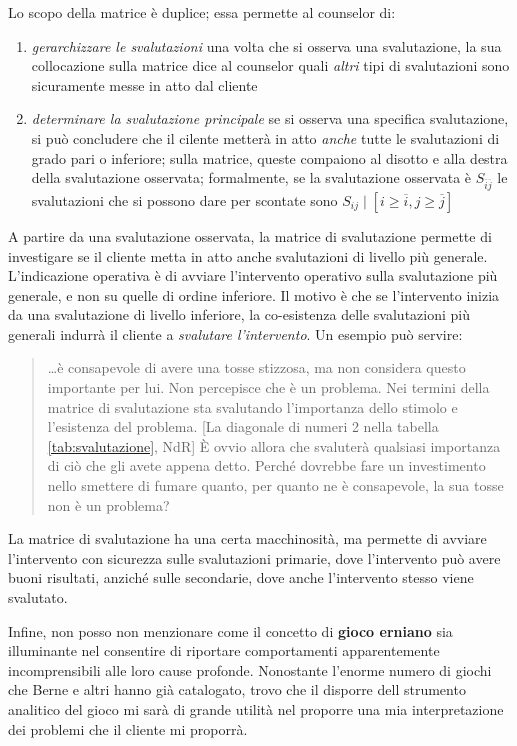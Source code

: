 \noindent Lo scopo della matrice è duplice; essa permette al counselor di:
\begin{enumerate}
\item \emph{gerarchizzare le svalutazioni} una volta che si osserva una svalutazione, la sua collocazione sulla matrice dice al counselor quali \emph{altri} tipi di svalutazioni sono sicuramente messe in atto dal cliente
\item \emph{determinare la svalutazione principale} se si osserva una specifica svalutazione, si può concludere che il cilente metterà in atto \emph{anche} tutte le svalutazioni di grado pari o inferiore; sulla matrice, queste compaiono al disotto e alla destra della svalutazione osservata; formalmente, se la svalutazione osservata è $S_{\overline{i}\overline{j}}$ le svalutazioni che si possono dare per scontate sono $S_{ij} \mid [i\geq\overline{i}, j\geq\overline{j}]$
\end{enumerate}

\noindent A partire da una svalutazione osservata, la matrice di svalutazione permette di investigare se il cliente metta in atto anche svalutazioni di livello più generale. L'indicazione operativa è di avviare l'intervento operativo sulla svalutazione più generale, e non su quelle di ordine inferiore. Il motivo è che se l'intervento inizia da una svalutazione di livello inferiore, la co-esistenza delle svalutazioni più generali indurrà il cliente a \emph{svalutare l'intervento}. Un esempio può servire:
\begin{quotation}
\ldots è consapevole di avere una tosse stizzosa, ma non considera questo importante per lui. Non percepisce che è un problema. Nei termini della matrice di svalutazione sta svalutando l'importanza dello stimolo e l'esistenza del problema. [La diagonale di numeri 2 nella tabella \ref{tab:svalutazione}, NdR]
\`{E} ovvio allora che svaluterà qualsiasi importanza di ciò che gli avete appena detto. Perché dovrebbe fare un investimento nello smettere di fumare quanto, per quanto ne è consapevole, la sua tosse non è un problema?
\end{quotation}

\noindent La matrice di svalutazione ha una certa macchinosità, ma permette di avviare l'intervento con sicurezza sulle svalutazioni primarie, dove l'intervento può avere buoni risultati, anziché sulle secondarie, dove anche l'intervento stesso viene svalutato.

Infine, non posso non menzionare come il concetto di \textbf{gioco erniano} sia illuminante nel consentire di riportare comportamenti apparentemente incomprensibili alle loro cause profonde. Nonostante l'enorme numero di giochi che Berne e altri hanno già catalogato, trovo che il disporre dell strumento analitico del gioco mi sarà di grande utilità nel proporre una mia interpretazione dei problemi che il cliente mi proporrà.

